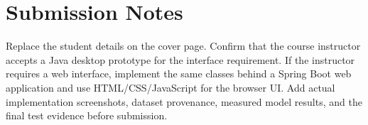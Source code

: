 \documentclass[12pt,a4paper]{report}
\begin{document}
\appendix
\chapter{Submission Notes}
Replace the student details on the cover page. Confirm that the course instructor accepts a Java desktop prototype for the interface requirement. If the instructor requires a web interface, implement the same classes behind a Spring Boot web application and use HTML/CSS/JavaScript for the browser UI. Add actual implementation screenshots, dataset provenance, measured model results, and the final test evidence before submission.
\end{document}

